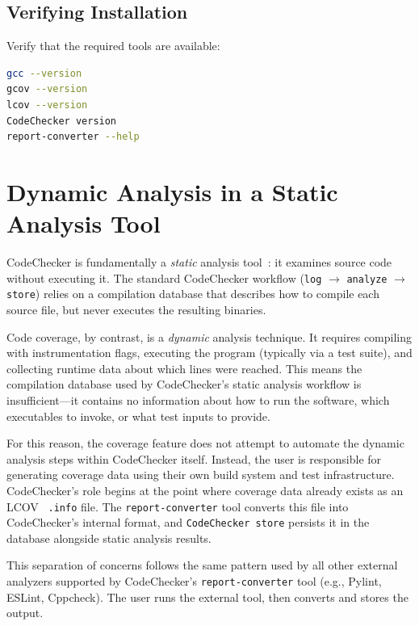 \subsection{Verifying Installation}

Verify that the required tools are available:
\begin{lstlisting}[language=bash, caption={Verifying coverage tools installation}]
gcc --version
gcov --version
lcov --version
CodeChecker version
report-converter --help
\end{lstlisting}

\section{Dynamic Analysis in a Static Analysis Tool}
\label{sec:design-decision}

CodeChecker is fundamentally a \emph{static} analysis tool~\cite{codechecker}: it examines source code without executing it. The standard CodeChecker workflow (\texttt{log} $\rightarrow$ \texttt{analyze} $\rightarrow$ \texttt{store}) relies on a compilation database that describes how to compile each source file, but never executes the resulting binaries.

Code coverage, by contrast, is a \emph{dynamic} analysis technique. It requires compiling with instrumentation flags, executing the program (typically via a test suite), and collecting runtime data about which lines were reached. This means the compilation database used by CodeChecker's static analysis workflow is insufficient---it contains no information about how to run the software, which executables to invoke, or what test inputs to provide.

For this reason, the coverage feature does not attempt to automate the dynamic analysis steps within CodeChecker itself. Instead, the user is responsible for generating coverage data using their own build system and test infrastructure. CodeChecker's role begins at the point where coverage data already exists as an LCOV~\cite{lcov} \texttt{.info} file. The \texttt{report-converter} tool converts this file into CodeChecker's internal format, and \texttt{CodeChecker store} persists it in the database alongside static analysis results.

This separation of concerns follows the same pattern used by all other external analyzers supported by CodeChecker's \texttt{report-converter} tool (e.g., Pylint, ESLint, Cppcheck). The user runs the external tool, then converts and stores the output.

